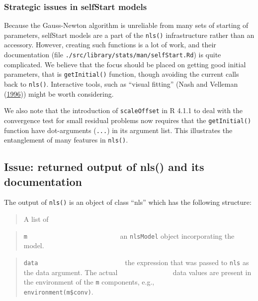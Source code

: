 \documentclass[
]{article}
\begin{document}
\hypertarget{strategic-issues-in-selfstart-models}{%
\subsubsection{Strategic issues in selfStart
models}\label{strategic-issues-in-selfstart-models}}

Because the Gauss-Newton algorithm is unreliable from many sets of
starting of parameters, selfStart models are a part of the
\texttt{nls()} infrastructure rather than an accessory. However,
creating such functions is a lot of work, and their documentation (file
\texttt{./src/library/stats/man/selfStart.Rd}) is quite complicated. We
believe that the focus should be placed on getting good initial
parameters, that is \texttt{getInitial()} function, though avoiding the
current calls back to \texttt{nls()}. Interactive tools, such as
``visual fitting'' (Nash and Velleman
(\protect\hyperlink{ref-nash1996nonlinear}{1996})) might be worth
considering.

We also note that the introduction of \texttt{scaleOffset} in R 4.1.1 to
deal with the convergence test for small residual problems now requires
that the \texttt{getInitial()} function have dot-arguments
(\texttt{...}) in its argument list. This illustrates the entanglement
of many features in \texttt{nls()}.

\hypertarget{issue-returned-output-of-nls-and-its-documentation}{%
\subsection{Issue: returned output of nls() and its
documentation}\label{issue-returned-output-of-nls-and-its-documentation}}

The output of \texttt{nls()} is an object of class ``nls'' which has the
following structure:

\begin{quote}
A list of
\end{quote}

\begin{quote}
\texttt{m} ~ ~ ~ ~ ~ ~ ~ ~ ~ ~ ~ ~ ~ ~ ~~ an \texttt{nlsModel} object
incorporating the model.
\end{quote}

\begin{quote}
\texttt{data} ~ ~ ~ ~ ~ ~ ~ ~ ~ ~ ~ ~ ~ ~ ~the expression that was
passed to \texttt{nls} as the data argument. The actual \newline
\(~~~~~~~~~~~~~~~~~~~~~~~~~~~~~~~~~\) data values are present in the
environment of the \texttt{m} components, e.g.,
\newline \(~~~~~~~~~~~~~~~~~~~~~~~~~~~~~~~~~\)
\texttt{environment(m\$conv)}.
\end{quote}
\end{document}
